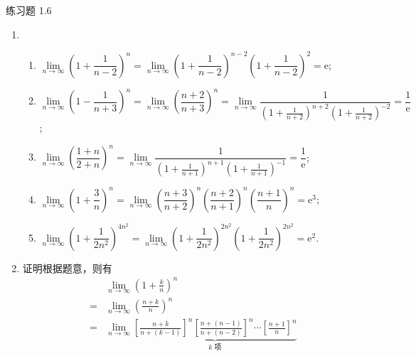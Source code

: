 


% 


\begin{center}
    {\heiti 练习题 1.6}
\end{center}

\begin{enumerate}
    \item 
        \begin{enumerate}[(1)]
            \item $\lim\limits_{n\to\infty}\left(1 + \dfrac{1}{n-2}\right)^n = \lim\limits_{n\to\infty}\left(1 + \dfrac{1}{n-2}\right)^{n-2}\left(1 + \dfrac{1}{n-2}\right)^2 = \mathrm{e}$;
            \item $\lim\limits_{n\to\infty}\left(1 - \dfrac{1}{n+3}\right)^n = \lim\limits_{n\to\infty}\left(\dfrac{n+2}{n+3}\right)^n = \lim\limits_{n\to\infty}\dfrac{1}{\left(1 + \frac{1}{n+2}\right)^{n+2}\left(1 + \frac{1}{n+2}\right)^{-2}} = \dfrac{1}{\mathrm{e}}$;
            \item $\lim\limits_{n\to\infty}\left(\dfrac{1+n}{2+n}\right)^n = \lim\limits_{n\to\infty}\dfrac{1}{\left(1 + \frac{1}{n+1}\right)^{n+1} \left(1 + \frac{1}{n+1}\right)^{-1}} = \dfrac{1}{\mathrm{e}}$;
            \item $\lim\limits_{n\to\infty}\left(1 + \dfrac 3n\right)^n = \lim\limits_{n\to\infty}\left(\dfrac{n+3}{n+2}\right)^n\left(\dfrac{n+2}{n+1}\right)^n\left(\dfrac{n+1}{n}\right)^n = \mathrm{e}^3$;
            \item $\lim\limits_{n\to\infty}\left(1 + \dfrac{1}{2n^2}\right)^{4n^2} = \lim\limits_{n\to\infty}\left(1 + \dfrac{1}{2n^2}\right)^{2n^2} \left(1 + \dfrac{1}{2n^2}\right)^{2n^2} = \mathrm{e}^2$.
        \end{enumerate}
    \item {\heiti 证明}\quad 根据题意，则有
        \begin{align*}
                & \lim_{n\to\infty}\left(1 + \frac kn\right)^n \\
            ={} & \lim_{n\to\infty}\left(\frac{n+k}{n}\right)^n \\
            ={} & \lim_{n\to\infty}\underbrace{\left[\frac{n+k}{n+(k-1)}\right]^n\left[\frac{n+(n-1)}{n+(n-2)}\right]^n\cdots\left[\frac{n+1}{n}\right]^n}_{\text{$k$ 项}} \\

\end{align*}
\end{enumerate}
